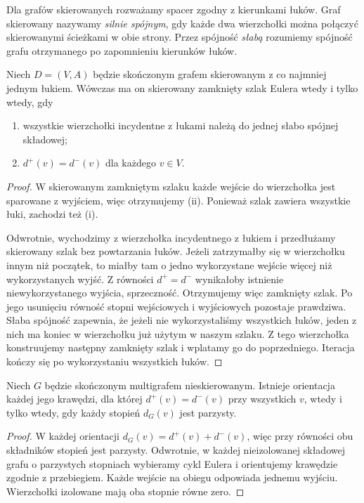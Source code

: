 Dla grafów skierowanych rozważamy spacer zgodny z kierunkami
łuków. Graf skierowany nazywamy \emph{silnie spójnym}, gdy
każde dwa wierzchołki można połączyć skierowanymi ścieżkami
w obie strony. Przez spójność \emph{słabą} rozumiemy spójność
grafu otrzymanego po zapomnieniu kierunków łuków.

\begin{twierdzenie}
Niech $D=(V,A)$ będzie skończonym grafem skierowanym
z co najmniej jednym łukiem. Wówczas ma on skierowany
zamknięty szlak Eulera wtedy i tylko wtedy, gdy
\begin{enumerate}[label=(\roman*)]
\item wszystkie wierzchołki incydentne z łukami należą do
jednej słabo spójnej składowej;
\item $d^+(v)=d^-(v)$ dla każdego $v\in V$.
\end{enumerate}
\end{twierdzenie}

\begin{proof}
W skierowanym zamkniętym szlaku każde wejście do wierzchołka
jest sparowane z wyjściem, więc otrzymujemy (ii).
Ponieważ szlak zawiera wszystkie łuki, zachodzi też (i).

Odwrotnie, wychodzimy z wierzchołka incydentnego z łukiem
i przedłużamy skierowany szlak bez powtarzania łuków.
Jeżeli zatrzymałby się w wierzchołku innym niż początek,
to miałby tam o jedno wykorzystane wejście więcej niż
wykorzystanych wyjść. Z równości $d^+=d^-$ wynikałoby
istnienie niewykorzystanego wyjścia, sprzeczność.
Otrzymujemy więc zamknięty szlak. Po jego usunięciu
równość stopni wejściowych i wyjściowych pozostaje prawdziwa.
Słaba spójność zapewnia, że jeżeli nie wykorzystaliśmy
wszystkich łuków, jeden z nich ma koniec w wierzchołku
już użytym w naszym szlaku. Z tego wierzchołka konstruujemy
następny zamknięty szlak i wplatamy go do poprzedniego.
Iteracja kończy się po wykorzystaniu wszystkich łuków.
\end{proof}

\begin{stwierdzenie}
Niech $G$ będzie skończonym multigrafem nieskierowanym.
Istnieje orientacja każdej jego krawędzi, dla której
$d^+(v)=d^-(v)$ przy wszystkich $v$, wtedy i tylko wtedy,
gdy każdy stopień $d_G(v)$ jest parzysty.
\end{stwierdzenie}

\begin{proof}
W każdej orientacji $d_G(v)=d^+(v)+d^-(v)$,
więc przy równości obu składników stopień jest parzysty.
Odwrotnie, w każdej nieizolowanej składowej grafu o
parzystych stopniach wybieramy cykl Eulera i orientujemy
krawędzie zgodnie z przebiegiem. Każde wejście na obiegu
odpowiada jednemu wyjściu. Wierzchołki izolowane mają
oba stopnie równe zero.
\end{proof}

